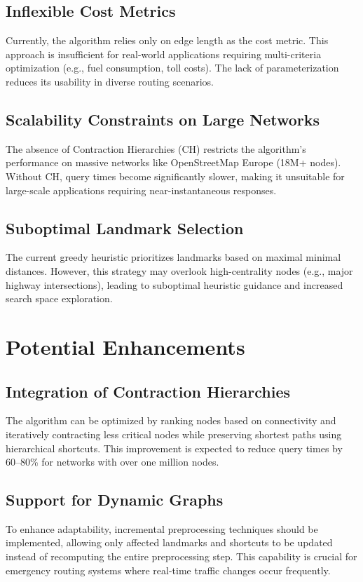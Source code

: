\subsection{Inflexible Cost Metrics}
Currently, the algorithm relies only on edge length as the cost metric. This approach is insufficient for real-world applications requiring multi-criteria optimization (e.g., fuel consumption, toll costs). The lack of parameterization reduces its usability in diverse routing scenarios.

\subsection{Scalability Constraints on Large Networks}
The absence of Contraction Hierarchies (CH) restricts the algorithm's performance on massive networks like OpenStreetMap Europe (18M+ nodes). Without CH, query times become significantly slower, making it unsuitable for large-scale applications requiring near-instantaneous responses.

\subsection{Suboptimal Landmark Selection}
The current greedy heuristic prioritizes landmarks based on maximal minimal distances. However, this strategy may overlook high-centrality nodes (e.g., major highway intersections), leading to suboptimal heuristic guidance and increased search space exploration.

\section{Potential Enhancements}

\subsection{Integration of Contraction Hierarchies}
The algorithm can be optimized by ranking nodes based on connectivity and iteratively contracting less critical nodes while preserving shortest paths using hierarchical shortcuts. This improvement is expected to reduce query times by 60–80\% for networks with over one million nodes.

\subsection{Support for Dynamic Graphs}
To enhance adaptability, incremental preprocessing techniques should be implemented, allowing only affected landmarks and shortcuts to be updated instead of recomputing the entire preprocessing step. This capability is crucial for emergency routing systems where real-time traffic changes occur frequently.

